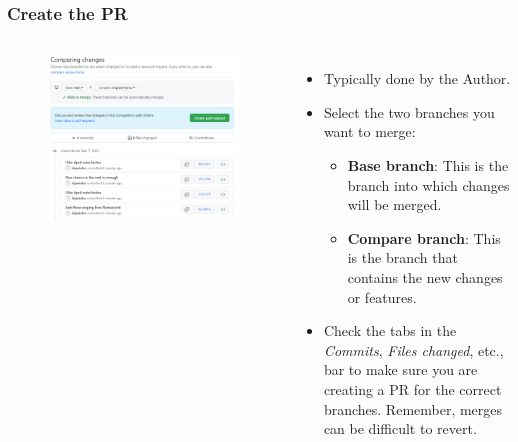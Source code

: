 \documentclass[aspectratio=169]{beamer}
\begin{document}
\begin{frame}
	\frametitle{Create the PR}
	\begin{columns}[c]
		
		\vspace{-.75cm}
		\begin{figure}
			\centering
			\includegraphics[width=\textwidth]{./img/create-pr-0.png}
		\end{figure}
		
		\begin{itemize}
			\setlength\itemsep{1em}
		\item Typically done by the Author.
		\item Select the two branches you want to merge:
		    \begin{itemize}
		        \item \textbf{Base branch}: This is the branch into which changes will be merged.
		        \item \textbf{Compare branch}: This is the branch that contains the new changes or features.
		    \end{itemize}
		\item Check the tabs in the \textit{Commits}, \textit{Files changed}, etc., bar to make sure you are creating a PR for the correct branches. Remember, merges can be difficult to revert.
	\end{itemize}
		
	\end{columns}
\end{frame}
\end{document}
